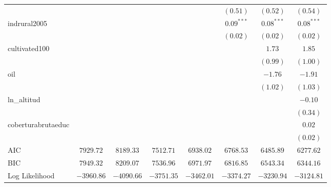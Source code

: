 \begin{tabular}{l c c c c c c c}
                                    &               &               &               &               & $(0.51)$      & $(0.52)$      & $(0.54)$     \\
indrural2005                        &               &               &               &               & $0.09^{***}$  & $0.08^{***}$  & $0.08^{***}$ \\
                                    &               &               &               &               & $(0.02)$      & $(0.02)$      & $(0.02)$     \\
cultivated100                       &               &               &               &               &               & $1.73$        & $1.85$       \\
                                    &               &               &               &               &               & $(0.99)$      & $(1.00)$     \\
oil                                 &               &               &               &               &               & $-1.76$       & $-1.91$      \\
                                    &               &               &               &               &               & $(1.02)$      & $(1.03)$     \\
ln\_altitud                         &               &               &               &               &               &               & $-0.10$      \\
                                    &               &               &               &               &               &               & $(0.34)$     \\
coberturabrutaeduc                  &               &               &               &               &               &               & $0.02$       \\
                                    &               &               &               &               &               &               & $(0.02)$     \\
\midrule
AIC                                 & $7929.72$     & $8189.33$     & $7512.71$     & $6938.02$     & $6768.53$     & $6485.89$     & $6277.62$    \\
BIC                                 & $7949.32$     & $8209.07$     & $7536.96$     & $6971.97$     & $6816.85$     & $6543.34$     & $6344.16$    \\
Log Likelihood                      & $-3960.86$    & $-4090.66$    & $-3751.35$    & $-3462.01$    & $-3374.27$    & $-3230.94$    & $-3124.81$   \\

\end{tabular}
